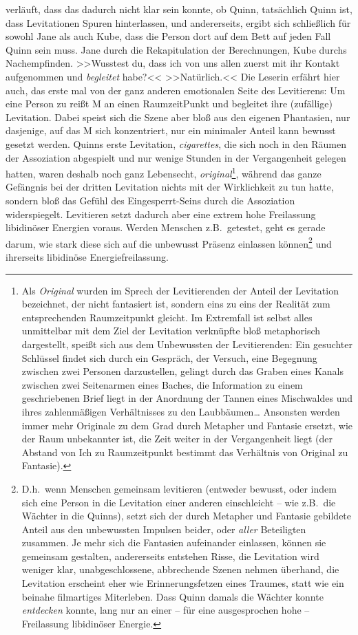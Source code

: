 verläuft, dass das dadurch nicht klar sein konnte, ob Quinn, tatsächlich Quinn
ist, dass Levitationen Spuren hinterlassen\qdots{}, und andererseits, ergibt
sich schließlich für sowohl Jane als auch Kube, dass die Person dort auf dem
Bett auf jeden Fall Quinn sein muss. 
Jane durch die Rekapitulation der Berechnungen, Kube durchs Nachempfinden. 
>>Wusstest du, dass ich von uns allen zuerst mit ihr Kontakt aufgenommen und
\emph{begleitet} habe?<< 
>>Natürlich.<<
Die Leserin erfährt hier auch, das erste mal von der ganz anderen emotionalen
Seite des Levitierens: Um eine Person zu  reißt M an einen
RaumzeitPunkt und begleitet ihre (zufällige) Levitation. 
Dabei speist sich die Szene aber bloß aus den eigenen Phantasien, nur dasjenige,
auf das M sich konzentriert, nur ein minimaler Anteil kann bewusst gesetzt
werden. 
Quinns erste Levitation, \emph{cigarettes}, die sich noch in den Räumen der
Assoziation abgespielt und nur wenige Stunden in der Vergangenheit gelegen
hatten, waren deshalb noch ganz Lebensecht, \emph{original}\footnote{
  Als \emph{Original} wurden im Sprech der Levitierenden der Anteil der
  Levitation bezeichnet, der nicht fantasiert ist, sondern eins zu eins der
  Realität zum entsprechenden Raumzeitpunkt gleicht. 
  Im Extremfall ist selbst alles unmittelbar mit dem Ziel der Levitation
  verknüpfte bloß metaphorisch dargestellt, speißt sich aus dem Unbewussten der
  Levitierenden: Ein gesuchter Schlüssel findet sich durch ein Gespräch, der
  Versuch, eine Begegnung zwischen zwei Personen darzustellen, gelingt durch das
  Graben eines Kanals zwischen zwei Seitenarmen eines Baches, die Information zu
  einem geschriebenen Brief liegt in der Anordnung der Tannen eines Mischwaldes
  und ihres zahlenmäßigen Verhältnisses zu den Laubbäumen\dots{} Ansonsten
  werden immer mehr Originale zu dem Grad durch Metapher und Fantasie ersetzt,
  wie der Raum unbekannter ist, die Zeit weiter in der Vergangenheit liegt (der
  Abstand von Ich zu Raumzeitpunkt bestimmt das Verhältnis von Original zu
  Fantasie).
}, während das ganze Gefängnis bei der dritten Levitation nichts mit der
Wirklichkeit zu tun hatte, sondern bloß das Gefühl des Eingesperrt-Seins durch
die Assoziation widerspiegelt. 
Levitieren setzt dadurch aber eine extrem hohe Freilassung libidinöser Energien
voraus. 
Werden Menschen z.B.~getestet, geht es gerade darum, wie stark diese sich auf
die unbewusst Präsenz einlassen können\footnote{
  D.h.~wenn Menschen gemeinsam levitieren (entweder bewusst, oder indem sich
  eine Person in die Levitation einer anderen einschleicht -- wie z.B.~die Wächter
  in die Quinns), setzt sich der durch Metapher und Fantasie gebildete Anteil
  aus den unbewussten Impulsen beider, oder \emph{aller} Beteiligten zusammen. 
  Je mehr sich die Fantasien aufeinander einlassen, können sie gemeinsam
  gestalten, andererseits entstehen Risse, die Levitation wird weniger klar,
  unabgeschlossene, abbrechende Szenen nehmen überhand, die Levitation erscheint
  eher wie Erinnerungsfetzen eines Traumes, statt wie ein beinahe filmartiges
  Miterleben.
  Dass Quinn damals die Wächter konnte \emph{entdecken} konnte, lang nur an
  einer -- für eine  ausgesprochen hohe -- Freilassung libidinöser
  Energie.
} und ihrerseits libidinöse Energiefreilassung. 
